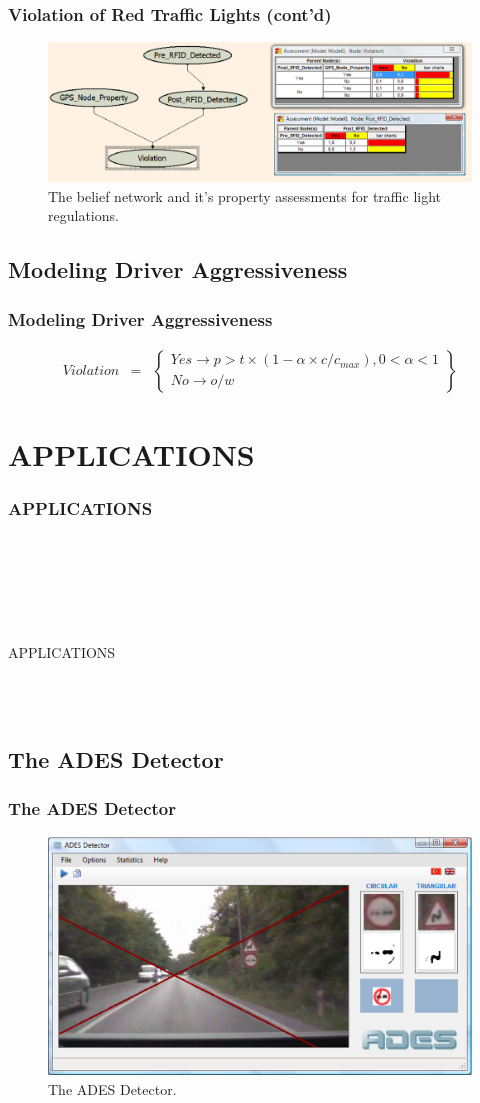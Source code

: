 \documentclass{beamer}
\newcommand{\mysectionpage}[2]{
	\begin{frame}
		\frametitle{#1}
		~\\~
		\begin{block}{}
			~\\~
			\begin{center}
				#2
			\end{center}
			~\\~
		\end{block}
	\end{frame}
}
\begin{document}
\begin{frame}[fragile]
	\frametitle{Violation of Red Traffic Lights (cont'd)}
	\begin{figure}[ht]
	\begin{center}
	\includegraphics[width=.8\paperwidth]{../img/redlight_bn.eps}
	\caption{The belief network and it's property assessments for traffic light regulations.}
	\label{fig:bnredlight}
	\end{center}
	\end{figure}
\end{frame}

\subsection{Modeling Driver Aggressiveness}
\frame
{
  \frametitle{Modeling Driver Aggressiveness}
  {\small
  \begin{eqnarray}
	\label{eq12}
	Violation &=& \left\{\begin{array}{l} Yes \rightarrow p>t\times(1-\alpha{\times}c/c_{max}), 0<\alpha<1 \\ No \rightarrow o/w \end{array}\right\}
	\end{eqnarray}
	}
}

\section{APPLICATIONS}
\mysectionpage{APPLICATIONS}{APPLICATIONS}

\subsection {The ADES Detector}
\frame
{
	\frametitle{The ADES Detector}
	\begin{figure}[ht]
	\begin{center}
	\includegraphics[width=.8\paperwidth]{../img/ADESDetector.eps}
	\caption{The ADES Detector.}
	\label{fig:adesdetector}
	\end{center}
	\end{figure}
}
\end{document}
